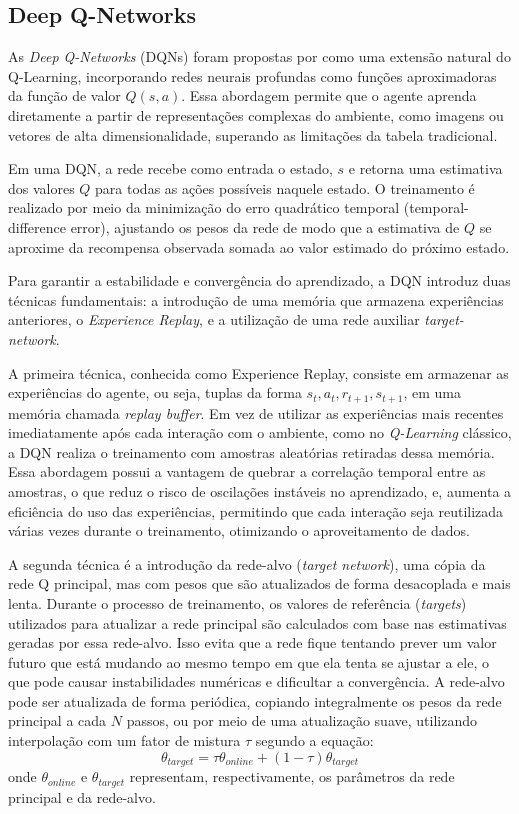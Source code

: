 \subsection{Deep Q-Networks}
As \textit{Deep Q-Networks} (DQNs) foram propostas por  
como uma extensão natural do Q-Learning, incorporando redes neurais profundas como funções aproximadoras 
da função de valor \(Q(s, a)\). Essa abordagem permite que o agente aprenda diretamente a partir de representações complexas do ambiente, 
como imagens ou vetores de alta dimensionalidade, superando as limitações da tabela tradicional.

Em uma DQN, a rede recebe como entrada o estado, \(s\) e retorna uma estimativa dos valores \(Q\)
para todas as ações possíveis naquele estado. O treinamento é realizado por meio da minimização do erro quadrático temporal 
(temporal-difference error), ajustando os pesos da rede de modo que a estimativa de \(Q\)
se aproxime da recompensa observada somada ao valor estimado do próximo estado.

Para garantir a estabilidade e convergência do aprendizado, a DQN introduz duas técnicas fundamentais: 
a introdução de uma memória que armazena experiências anteriores, o \textit{Experience Replay}, e a utilização
de uma rede auxiliar \textit{target-network}.

A primeira técnica, conhecida como Experience Replay, consiste em armazenar as experiências do agente, ou seja, tuplas da forma 
\( s_{t}, a_{t}, r_{t+1}, s_{t+1} \), em uma memória chamada \textit{replay buffer}. Em vez de utilizar as experiências mais 
recentes imediatamente após cada interação com o ambiente, como no \textit{Q-Learning} clássico, a DQN realiza o treinamento com amostras 
aleatórias retiradas dessa memória. Essa abordagem possui a vantagem de quebrar a correlação temporal entre as amostras, 
o que reduz o risco de oscilações instáveis no aprendizado,  e, aumenta a eficiência do uso das experiências, 
permitindo que cada interação seja reutilizada várias vezes durante o treinamento, otimizando o aproveitamento de dados.


A segunda técnica é a introdução da rede-alvo (\textit{target network}), uma cópia da rede Q principal, 
mas com pesos que são atualizados de forma desacoplada e mais lenta. Durante o processo de treinamento, 
os valores de referência (\textit{targets}) utilizados para atualizar a rede principal são calculados com base 
nas estimativas geradas por essa rede-alvo. Isso evita
que a rede fique tentando prever um valor futuro que está mudando 
ao mesmo tempo em que ela tenta se ajustar a ele, o que pode causar instabilidades numéricas e dificultar a convergência. 
A rede-alvo pode ser atualizada de forma periódica, copiando integralmente os pesos da rede principal a cada \(N\)
passos, ou por meio de uma atualização suave, utilizando interpolação com um fator de mistura \(\tau\) segundo a equação:
\begin{equation}
    \theta_{target} = \tau \theta_{online} + (1 - \tau)\theta_{target}
\end{equation}
\noindent onde \(\theta_{online}\) e \(\theta_{target}\) representam, respectivamente, os parâmetros da rede principal e da rede-alvo.

